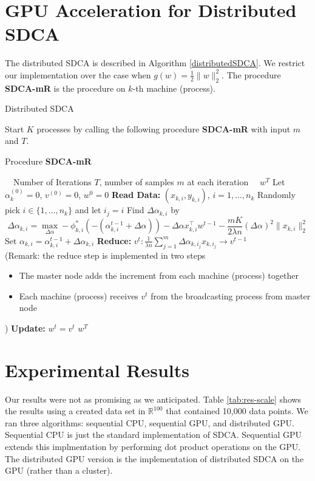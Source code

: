 \documentclass{article}
\def \R {\mathbb{R}}
\def \R {\mathbb{R}}
\begin{document}
\section{GPU Acceleration for Distributed SDCA}
The distributed SDCA \cite{yang2013trading} is described in Algorithm \ref{distributedSDCA}. We restrict our implementation over the case when $g(w)=\frac{1}{2}\|w\|_2^2$. The procedure \textbf{SDCA-mR} is the procedure on $k$-th machine (process).
\begin{algorithm}[H]
	\caption{Distributed SDCA}
	\label{distributedSDCA}
	\begin{algorithmic}[1]
		\STATE	Start $K$ processes by calling the following procedure \textbf{SDCA-mR} with input $m$ and $T$.\\ 
		\begin{center}Procedure \textbf{SDCA-mR}
			\end{center}
		\REQUIRE~~Number of Iterations $T$, number of samples $m$ at each iteration
		\ENSURE~~$w^{T}$
	\STATE Let $\alpha_k^{(0)}=0$, $v^{(0)}=0$, $w^{0}=0$
	\STATE \textbf{Read Data:} $(x_{k,i},y_{k,i})$, $i=1,\ldots,n_k$
	\STATE Randomly pick $i\in\{1,\ldots,n_k\}$ and let $i_j=i$
	\STATE Find $\Delta\alpha_{k,i}$ by
	\begin{equation*}
		\Delta\alpha_{k,i}=\max_{\Delta\alpha}-\phi_{k,i}^*(-(\alpha_{k,i}^{t-1}+\Delta\alpha))-\Delta\alpha x_{k,i}^\top w^{t-1}-\frac{mK}{2\lambda n}(\Delta\alpha)^2\|x_{k,i}\|_2^2
	\end{equation*}
	\STATE Set $\alpha_{k,i}=\alpha_{k,i}^{t-1}+\Delta\alpha_{k,i}$
	\ENDFOR
	\STATE \textbf{Reduce:} $v^{t}:\frac{1}{\lambda n}\sum_{j=1}^{m}\Delta\alpha_{k,i_j}x_{k,i_j}\rightarrow v^{t-1}$\\ (Remark: the reduce step is implemented in two steps
	\begin{itemize}
		\item The master node adds the increment from each machine (process) together
		 \item Each machine (process) receives $v^t$ from the broadcasting process from master node 
		\end{itemize})
	\STATE \textbf{Update:} $w^t=v^t$
	\ENDFOR
	\RETURN $w^T$
	\end{algorithmic}
\end{algorithm}
\section{Experimental Results}
Our results were not as promising as we anticipated. Table \ref{tab:res-scale}
shows the results using a created data set in $\R^{100}$ that contained 10,000
data points. We ran three algorithms: sequential CPU, sequential GPU, and
distributed GPU. Sequential CPU is just the standard implementation of SDCA.
Sequential GPU extends this implmentation by performing dot product operations
on the GPU. The distributed GPU version is the implementation of distributed
SDCA on the GPU (rather than a cluster).
\end{document}
